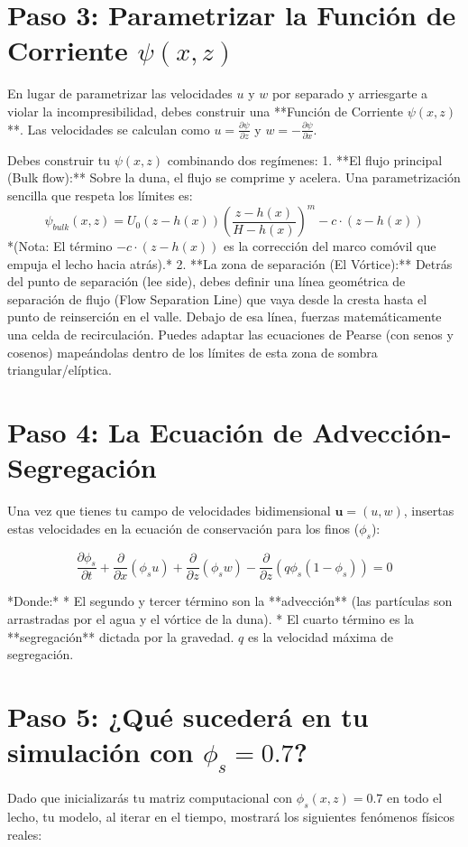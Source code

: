 \documentclass[11pt,a4paper]{article}
\begin{document}
\section{Paso 3: Parametrizar la Función de Corriente $\psi(x,z)$}
En lugar de parametrizar las velocidades $u$ y $w$ por separado y arriesgarte a violar la incompresibilidad, debes construir una **Función de Corriente $\psi(x,z)$**. Las velocidades se calculan como $u = \frac{\partial \psi}{\partial z}$ y $w = -\frac{\partial \psi}{\partial x}$.

Debes construir tu $\psi(x,z)$ combinando dos regímenes:
1.  **El flujo principal (Bulk flow):** Sobre la duna, el flujo se comprime y acelera. Una parametrización sencilla que respeta los límites es:
    $$ \psi_{bulk}(x,z) = U_0 (z - h(x)) \left( \frac{z - h(x)}{H - h(x)} \right)^m - c \cdot (z - h(x)) $$
    *(Nota: El término $-c \cdot (z - h(x))$ es la corrección del marco comóvil que empuja el lecho hacia atrás).*
2.  **La zona de separación (El Vórtice):** Detrás del punto de separación (lee side), debes definir una línea geométrica de separación de flujo (Flow Separation Line) que vaya desde la cresta hasta el punto de reinserción en el valle. Debajo de esa línea, fuerzas matemáticamente una celda de recirculación. Puedes adaptar las ecuaciones de Pearse (con senos y cosenos) mapeándolas dentro de los límites de esta zona de sombra triangular/elíptica.

\section{Paso 4: La Ecuación de Advección-Segregación}
Una vez que tienes tu campo de velocidades bidimensional $\mathbf{u} = (u, w)$, insertas estas velocidades en la ecuación de conservación para los finos ($\phi_s$):

$$ \frac{\partial \phi_s}{\partial t} + \frac{\partial}{\partial x} (\phi_s u) + \frac{\partial}{\partial z} (\phi_s w) - \frac{\partial}{\partial z} \left( q \phi_s (1 - \phi_s) \right) = 0 $$

*Donde:*
*   El segundo y tercer término son la **advección** (las partículas son arrastradas por el agua y el vórtice de la duna).
*   El cuarto término es la **segregación** dictada por la gravedad. $q$ es la velocidad máxima de segregación.

\section{Paso 5: ¿Qué sucederá en tu simulación con $\phi_s = 0.7$?}
Dado que inicializarás tu matriz computacional con $\phi_s(x,z) = 0.7$ en todo el lecho, tu modelo, al iterar en el tiempo, mostrará los siguientes fenómenos físicos reales:
\end{document}
